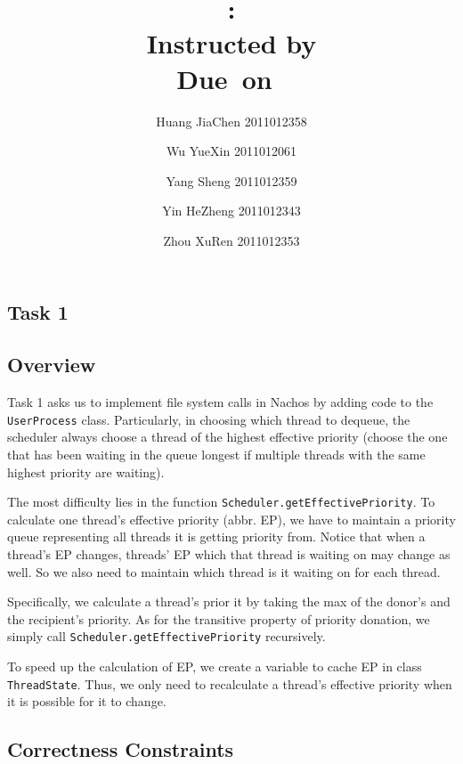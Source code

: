 \documentclass{article}
\title{\textmd{\bf \Class: \Title}\\{\large Instructed by \textit{\ClassInstructor}}\\\normalsize\vspace{0.1in}\small{Due\ on\ \DueDate}}
\date{}
\author{%
  Huang JiaChen 2011012358 \and
  Wu YueXin 2011012061 \and
  Yang Sheng 2011012359 \and
  Yin HeZheng 2011012343 \and
  Zhou XuRen 2011012353}
\begin{document}
  \begin{spacing}{1.1}
    \maketitle \thispagestyle{empty}


 
\section{Task 1}
\subsection{Overview}
Task 1 asks us to implement file system calls  in Nachos by adding code to the \texttt{UserProcess} class. Particularly, in choosing which  thread to dequeue, the scheduler always choose a thread of the highest effective priority (choose the one that has been waiting in the queue longest if multiple threads with the same highest priority are waiting).

The most difficulty lies in the function \texttt{Scheduler.getEffectivePriority}. To calculate one thread's effective priority (abbr. EP), we have to maintain a priority queue representing all threads it is getting priority from. Notice that when a thread's EP changes, threads' EP which that thread is waiting on may change as well. So we also need to maintain which thread is it waiting on for each thread.

Specifically, we calculate a thread's prior it  by taking the max of the donor's and the recipient's priority. As for the transitive property of priority donation, we simply call \texttt{Scheduler.getEffectivePriority} recursively.

To speed up the calculation of EP, we create a variable to cache EP in class \texttt{ThreadState}. Thus, we only need to recalculate a thread's effective priority when it is possible for it to change.

\subsection{Correctness Constraints}


\end{spacing}
\end{document}
